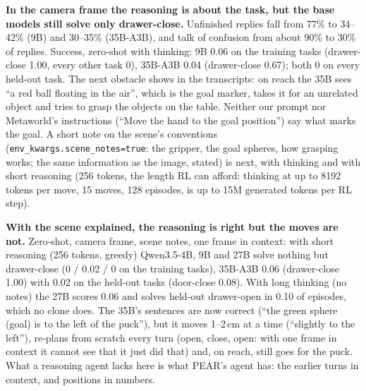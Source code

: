 \documentclass[11pt]{article}
\newcommand{\code}[1]{\texttt{#1}}
\begin{document}
\textbf{In the camera frame the reasoning is about the task, but the base models still solve only drawer-close.}
Unfinished replies fall from 77\% to 34--42\% (9B) and 30--35\% (35B-A3B), and talk of confusion from about 90\% to 30\%
of replies. Success, zero-shot with thinking: 9B 0.06 on the training tasks (drawer-close 1.00, every other task 0),
35B-A3B 0.04 (drawer-close 0.67); both 0 on every held-out task. The next obstacle shows in the transcripts: on reach the
35B sees ``a red ball floating in the air'', which is the goal marker, takes it for an unrelated object and tries to grasp
the objects on the table. Neither our prompt nor Metaworld's instructions (``Move the hand to the goal position'') say
what marks the goal. A short note on the scene's conventions (\code{env\_kwargs.scene\_notes=true}: the gripper, the
goal spheres, how grasping works; the same information as the image, stated) is next, with thinking and with short
reasoning (256 tokens, the length RL can afford: thinking at up to 8192 tokens per move, 15 moves, 128 episodes, is
up to 15M generated tokens per RL step).

\textbf{With the scene explained, the reasoning is right but the moves are not.} Zero-shot, camera frame, scene notes,
one frame in context: with short reasoning (256 tokens, greedy) Qwen3.5-4B, 9B and 27B solve nothing but drawer-close
(0 / 0.02 / 0 on the training tasks), 35B-A3B 0.06 (drawer-close 1.00) with 0.02 on the held-out tasks (door-close
0.08). With long thinking (no notes) the 27B scores 0.06 and solves held-out drawer-open in 0.10 of episodes, which
no clone does. The 35B's sentences are now correct (``the green sphere (goal) is to the left of the puck''), but it moves
1--2\,cm at a time (``slightly to the left''), re-plans from scratch every turn (open, close, open: with one frame in
context it cannot see that it just did that) and, on reach, still goes for the puck. What a reasoning agent lacks
here is what PEAR's agent has: the earlier turns in context, and positions in numbers.
\end{document}
